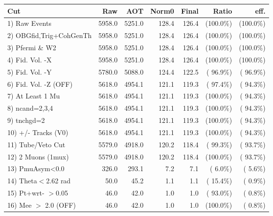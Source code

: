  \begin{table}[h!]\centering
 \begin{tabular}{||l||r|r|r|r|r|r||}
 \hline
 \hline
 Cut & Raw & AOT & Norm0 & Final & Ratio & eff.       \\
 \hline
  1) Raw Events           &       5958.0 &       5251.0 &        128.4 &        126.4 & (100.0\%) & (100.0\%) \\
  2) OBGfid,Trig+CohGenTh &       5958.0 &       5251.0 &        128.4 &        126.4 & (100.0\%) & (100.0\%) \\
  3) Pfermi \& W2         &       5958.0 &       5251.0 &        128.4 &        126.4 & (100.0\%) & (100.0\%) \\
  4) Fid. Vol. -X         &       5958.0 &       5251.0 &        128.4 &        126.4 & (100.0\%) & (100.0\%) \\
  5) Fid. Vol. -Y         &       5780.0 &       5088.0 &        124.4 &        122.5 & ( 96.9\%) & ( 96.9\%) \\
  6) Fid. Vol. -Z (OFF)   &       5618.0 &       4954.1 &        121.1 &        119.3 & ( 97.4\%) & ( 94.3\%) \\
  7) At Least 1 Mu        &       5618.0 &       4954.1 &        121.1 &        119.3 & (100.0\%) & ( 94.3\%) \\
  8) ncand=2,3,4          &       5618.0 &       4954.1 &        121.1 &        119.3 & (100.0\%) & ( 94.3\%) \\
  9) tnchgd=2             &       5618.0 &       4954.1 &        121.1 &        119.3 & (100.0\%) & ( 94.3\%) \\
 10) +/- Tracks (V0)      &       5618.0 &       4954.1 &        121.1 &        119.3 & (100.0\%) & ( 94.3\%) \\
 11) Tube/Veto Cut        &       5579.0 &       4918.0 &        120.2 &        118.4 & ( 99.3\%) & ( 93.7\%) \\
 12) 2 Muons (1mux)       &       5579.0 &       4918.0 &        120.2 &        118.4 & (100.0\%) & ( 93.7\%) \\
 13) PmuAsym<0.0          &        326.0 &        293.1 &          7.2 &          7.1 & (  6.0\%) & (  5.6\%) \\
 14) Theta$<$2.62 rad     &         50.0 &         45.2 &          1.1 &          1.1 & ( 15.4\%) & (  0.9\%) \\
 15) Pt+wrt- $>$0.05      &         46.0 &         42.0 &          1.0 &          1.0 & ( 93.0\%) & (  0.8\%) \\
 16) Mee $>$ 2.0  (OFF)   &         46.0 &         42.0 &          1.0 &          1.0 & (100.0\%) & (  0.8\%) \\

\end{tabular}
\end{table}
